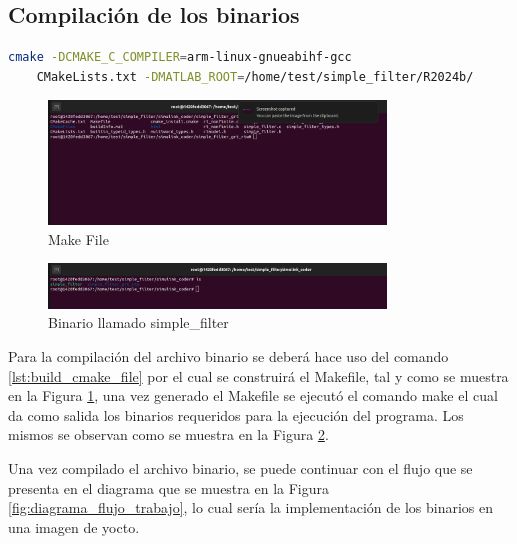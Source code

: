 \subsection{Compilación de los binarios}\label{subsec:compilacion_binario}

\begin{lstlisting}[language=bash, caption={Comando para la compilacion del programa}, label=lst:build_cmake_file]
    cmake -DCMAKE_C_COMPILER=arm-linux-gnueabihf-gcc 
    CMakeLists.txt -DMATLAB_ROOT=/home/test/simple_filter/R2024b/
\end{lstlisting}

\begin{figure}[h!]
    \centering
    \includegraphics[width=0.8\textwidth]{fig/especifico_2/paso_a_paso_mtmt/cmake_file.png}
    \caption{Make File}
    \label{fig:make_file}
\end{figure}


\begin{figure}[h!]
    \centering
    \includegraphics[width=0.8\textwidth]{fig/especifico_2/paso_a_paso_mtmt/binario_compilado.png}
    \caption{Binario llamado simple\_filter}
    \label{fig:binario_compilado}
\end{figure}

Para la compilación del archivo binario se deberá hace uso del comando \ref{lst:build_cmake_file} por el cual se construirá el Makefile, tal y como se muestra en la Figura \ref{fig:make_file}, una vez generado el Makefile se ejecutó el comando make el cual da como salida los binarios requeridos para la ejecución del programa. Los mismos se observan como se muestra en la Figura \ref{fig:binario_compilado}.

Una vez compilado el archivo binario, se puede continuar con el flujo que se presenta en el diagrama que se muestra en la Figura \ref{fig:diagrama_flujo_trabajo}, lo cual sería la implementación de los binarios en una imagen de yocto.


